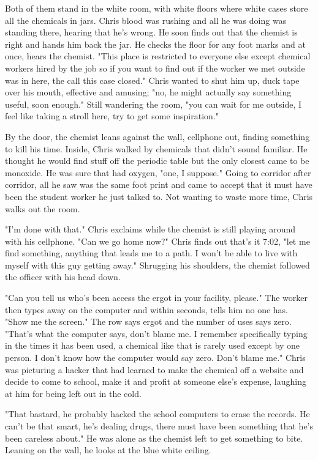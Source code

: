         Both of them stand in the white room, with white floors where white cases store all the chemicals in jars. Chris blood was rushing and
    all he was doing was standing there, hearing that he's wrong. He soon finds out that the chemist is right and hands him back the jar. He
    checks the floor for any foot marks and at once, hears the chemist. "This place is restricted to everyone else except chemical workers hired
    by the job so if you want to find out if the worker we met outside was in here, the call this case closed." Chris wanted to shut him up, 
    duck tape over his mouth, effective and amusing; "no, he might actually say something useful, soon enough." Still wandering the room, "you
    can wait for me outside, I feel like taking a stroll here, try to get some inspiration."

        By the door, the chemist leans against the wall, cellphone out, finding something to kill his time. Inside, Chris walked by chemicals
    that didn't sound familiar. He thought he would find stuff off the periodic table but the only closest came to be monoxide. He was sure that
    had oxygen, "one, I suppose." Going to corridor after corridor, all he saw was the same foot print and came to accept that it must have been
    the student worker he just talked to. Not wanting to waste more time, Chris walks out the room.

        "I'm done with that." Chris exclaims while the chemist is still playing around with his cellphone. "Can we go home now?" Chris finds out
    that's it 7:02, "let me find something, anything that leads me to a path. I won't be able to live with myself with this guy getting away."
    Shrugging his shoulders, the chemist followed the officer with his head down.

        "Can you tell us who's been access the ergot in your facility, please." The worker then types away on the computer and within seconds,
    tells him no one has. "Show me the screen."  The row says ergot and the number of uses says zero. "That's what the computer says, don't
    blame me. I remember specifically typing in the times it has been used, a chemical like that is rarely used except by one person. I don't
    know how the computer would say zero. Don't blame me." Chris was picturing a hacker that had learned to make the chemical off a website and
    decide to come to school, make it and profit at someone else's expense, laughing at him for being left out in the cold.

        "That bastard, he probably hacked the school computers to erase the records. He can't be that smart, he's dealing drugs, there must have
    been something that he's been careless about." He was alone as the chemist left to get something to bite. Leaning on the wall, he looks at the
    blue white ceiling.

